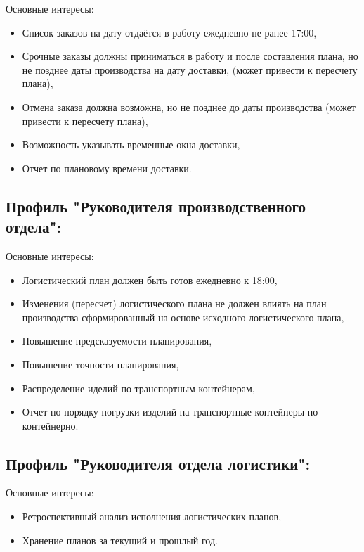 Основные интересы:
\begin{itemize}
    \item Список заказов на дату отдаётся в работу ежедневно не ранее 17:00,
    \item Срочные заказы должны приниматься в работу и после составления плана, но не позднее даты производства на дату доставки, (может привести к пересчету плана),
    \item Отмена заказа должна возможна, но не позднее до даты производства (может привести к пересчету плана),
    \item Возможность указывать временные окна доставки,
    \item Отчет по плановому времени доставки.
\end{itemize}

\subsection{Профиль "Руководителя производственного отдела":}
\label{subsec:mnf}

Основные интересы:
\begin{itemize}
    \item Логистический план должен быть готов ежедневно к 18:00,
    \item Изменения (пересчет) логистического плана не должен влиять на план производства сформированный на основе исходного логистического плана,
    \item Повышение предсказуемости планирования,
    \item Повышение точности планирования,
    \item Распределение иделий по транспортным контейнерам,
    \item Отчет по порядку погрузки изделий на транспортные контейнеры по-контейнерно.
\end{itemize}

\subsection{Профиль "Руководителя отдела логистики":}
\label{subsec:logman}

Основные интересы:
\begin{itemize}
    \item Ретроспективный анализ исполнения логистических планов,
    \item Хранение планов за текущий и прошлый год.
\end{itemize}

